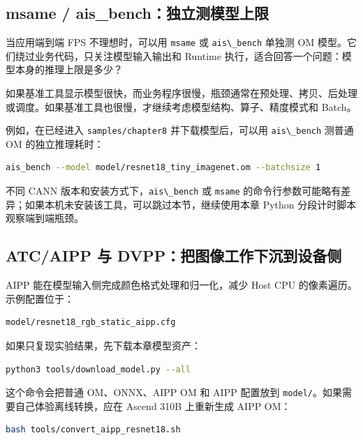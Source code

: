 \subsection{msame /
ais\_bench：独立测模型上限}\label{src-book-chapter8-h7}

当应用端到端 FPS 不理想时，可以用 \passthrough{\lstinline!msame!} 或
\passthrough{\lstinline!ais\_bench!} 单独测 OM
模型。它们绕过业务代码，只关注模型输入输出和 Runtime
执行，适合回答一个问题：模型本身的推理上限是多少？

如果基准工具显示模型很快，而业务程序很慢，瓶颈通常在预处理、拷贝、后处理或调度。如果基准工具也很慢，才继续考虑模型结构、算子、精度模式和
Batch。

例如，在已经进入 \passthrough{\lstinline!samples/chapter8!}
并下载模型后，可以用 \passthrough{\lstinline!ais\_bench!} 测普通 OM
的独立推理耗时：

\begin{lstlisting}[language=bash]
ais_bench --model model/resnet18_tiny_imagenet.om --batchsize 1
\end{lstlisting}

不同 CANN 版本和安装方式下，\passthrough{\lstinline!ais\_bench!} 或
\passthrough{\lstinline!msame!}
的命令行参数可能略有差异；如果本机未安装该工具，可以跳过本节，继续使用本章
Python 分段计时脚本观察端到端瓶颈。

\subsection{ATC/AIPP 与
DVPP：把图像工作下沉到设备侧}\label{src-book-chapter8-h8}

AIPP 能在模型输入侧完成颜色格式处理和归一化，减少 Host CPU
的像素遍历。示例配置位于：

\begin{lstlisting}
model/resnet18_rgb_static_aipp.cfg
\end{lstlisting}

如果只复现实验结果，先下载本章模型资产：

\begin{lstlisting}[language=bash]
python3 tools/download_model.py --all
\end{lstlisting}

这个命令会把普通 OM、ONNX、AIPP OM 和 AIPP 配置放到
\passthrough{\lstinline!model/!}。如果需要自己体验离线转换，应在 Ascend
310B 上重新生成 AIPP OM：

\begin{lstlisting}[language=bash]
bash tools/convert_aipp_resnet18.sh
\end{lstlisting}

